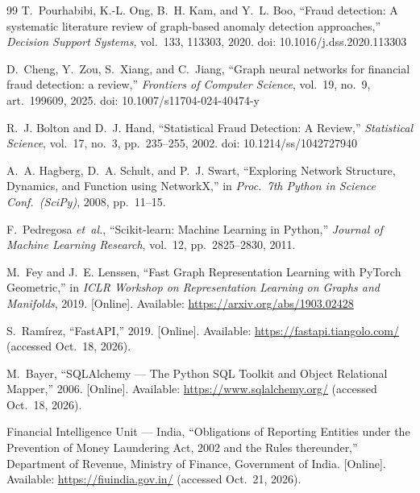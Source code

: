 \begin{thebibliography}{99}
 T.~Pourhabibi, K.-L. Ong, B.~H. Kam, and Y.~L. Boo, ``Fraud detection: A systematic literature review of graph-based anomaly detection approaches,'' \textit{Decision Support Systems}, vol.~133, 113303, 2020. doi: 10.1016/j.dss.2020.113303

 D.~Cheng, Y.~Zou, S.~Xiang, and C.~Jiang, ``Graph neural networks for financial fraud detection: a review,'' \textit{Frontiers of Computer Science}, vol.~19, no.~9, art.~199609, 2025. doi: 10.1007/s11704-024-40474-y

 R.~J. Bolton and D.~J. Hand, ``Statistical Fraud Detection: A Review,'' \textit{Statistical Science}, vol.~17, no.~3, pp.~235--255, 2002. doi: 10.1214/ss/1042727940

 A.~A. Hagberg, D.~A. Schult, and P.~J. Swart, ``Exploring Network Structure, Dynamics, and Function using NetworkX,'' in \textit{Proc.\ 7th Python in Science Conf.\ (SciPy)}, 2008, pp.~11--15.

 F.~Pedregosa \textit{et~al.}, ``Scikit-learn: Machine Learning in Python,'' \textit{Journal of Machine Learning Research}, vol.~12, pp.~2825--2830, 2011.

 M.~Fey and J.~E. Lenssen, ``Fast Graph Representation Learning with PyTorch Geometric,'' in \textit{ICLR Workshop on Representation Learning on Graphs and Manifolds}, 2019. [Online]. Available: \url{https://arxiv.org/abs/1903.02428}

 S.~Ram\'irez, ``FastAPI,'' 2019. [Online]. Available: \url{https://fastapi.tiangolo.com/} (accessed Oct.~18, 2026).

 M.~Bayer, ``SQLAlchemy --- The Python SQL Toolkit and Object Relational Mapper,'' 2006. [Online]. Available: \url{https://www.sqlalchemy.org/} (accessed Oct.~18, 2026).

 Financial Intelligence Unit --- India, ``Obligations of Reporting Entities under the Prevention of Money Laundering Act, 2002 and the Rules thereunder,'' Department of Revenue, Ministry of Finance, Government of India. [Online]. Available: \url{https://fiuindia.gov.in/} (accessed Oct.~21, 2026).

\end{thebibliography}
